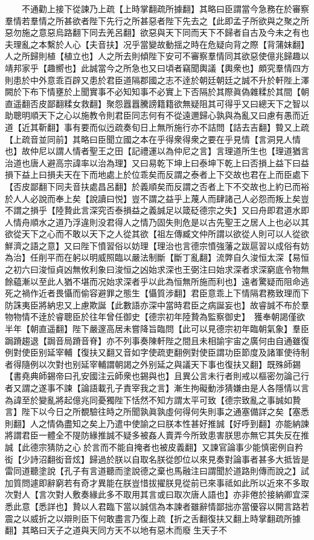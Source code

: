 　　不通勸上接下從諫乃上疏【上時掌翻疏所據翻】其略曰臣謂當今急務在於審察羣情若羣情之所甚欲者陛下先行之所甚惡者陛下先去之【此即孟子所欲與之聚之所惡勿施之意惡烏路翻下同去羌呂翻】欲惡與天下同而天下不歸者自古及今未之有也夫理亂之本繫於人心【夫音扶】况乎當變故動揺之時在危疑向背之際【背蒲妺翻】人之所歸則植【植立也】人之所去則傾陛下安可不審察羣情同其欲惡使億兆歸趣以靖邦家乎【趣嚮也】此誠當今之所急也又曰頃者竊聞輿議【輿衆也】頗究羣情四方則患於中外意乖百辟又患於君臣道隔郡國之志不逹於朝廷朝廷之誠不升於軒陛上澤闕於下布下情壅於上聞實事不必知知事不必實上下否隔於其際眞偽雜糅於其間【朝直遥翻否皮鄙翻糅女救翻】聚怨囂囂騰謗籍籍欲無疑阻其可得乎又曰總天下之智以助聰明順天下之心以施教令則君臣同志何有不從遠邇歸心孰與為亂又曰慮有愚而近道【近其靳翻】事有要而似迃疏奏旬日上無所施行亦不詰問【詰去吉翻】䞇又上疏【上疏音並同前】其略曰臣聞立國之本在乎得衆得衆之要在乎見情【言洞見人情也】故仲尼以謂人情者聖王之田【記禮運以為仲尼之言】言理道所生也【理道猶言治道也唐人避高宗諱率以治為理】又曰易乾下坤上曰泰坤下乾上曰否損上益下曰益損下益上曰損夫天在下而地處上於位乖矣而反謂之泰者上下交故也君在上而臣處下【否皮鄙翻下同夫音扶處昌呂翻】於義順矣而反謂之否者上下不交故也上約已而裕於人人必說而奉上矣【說讀曰悦】豈不謂之益乎上蔑人而肆諸己人必怨而叛上矣豈不謂之損乎【陸贄此言深究否泰損益之義誠足以箴砭德宗之失】又曰舟即君道水即人情舟順水之道乃浮違則没君得人之情乃固失則危是以古先聖王之居人上也必以其欲從天下之心而不敢以天下之人從其欲【祖左傳臧文仲所謂以欲從人則可以人從欲鮮濟之語之意】又曰陛下憤習俗以妨理【理治也言德宗憤強藩之跋扈習以成俗有妨為治】任削平而在躬以明威照臨以嚴法制斷【斷丁亂翻】流弊自久浚恒太深【易恒之初六曰浚恒貞凶無攸利象曰浚恒之凶始求深也王弼注曰始求深者求深窮底令物無餘藴漸以至此人猶不堪而况始求深者乎以此為恒無所施而利也】遠者驚疑而阻命逃死之禍作近者畏懾而偷容避罪之態生【懾質涉翻】君臣意乖上下情隔君務致理而下防誅夷臣將納忠又上慮欺誕【此數語亦深中當時君臣之病誕妄也】故睿誠不布於羣物物情不逹於睿聰臣於往年曾任御史【德宗初年陸贄為監察御史】　獲奉朝謁僅欲半年【朝直遥翻】陛下嚴邃高居未嘗降旨臨問【此可以見德宗初年臨朝氣象】羣臣跼蹐趨退【跼音局蹐音脊】亦不列事奏陳軒陛之間且未相諭宇宙之廣何由自通雖復例對使臣别延宰輔【復扶又翻又音如字使疏吏翻例對使臣謂功臣節度及諸軍使待制者得隨例以次對也别延宰輔謂朝謁之外别延之與議天下事也復扶又翻】既殊師錫【書堯典師錫帝曰孔安國注云師衆也錫與也】且異公言未行者則戒以樞密勿論己行者又謂之遂事不諫【論語載孔子責宰我之言】漸生拘礙動涉猜嫌由是人各隱情以言為諱至於變亂將起億兆同憂獨陛下恬然不知方謂太平可致【德宗致亂之事誠如贄言】陛下以今日之所覩驗往時之所聞孰眞孰虛何得何失則事之通塞備詳之矣【塞悉則翻】人之情偽盡知之矣上乃遣中使諭之曰朕本性甚好推誠【好呼到翻】亦能納諫將謂君臣一體全不隄防緣推誠不疑多被姦人賣弄今所致患害朕思亦無它其失反在推誠【此德宗猜防之心於言而不能自掩者也被皮義翻】又諫官論事少能慎密例自矜衒【少詩沼翻衒音炫】歸過於朕以自取名朕從卽位以來見奏對論事者甚多大抵皆是雷同道聽塗說【孔子有言道聽而塗說德之棄也馬融注曰謂聞於道路則傳而說之】試加質問遽即辭窮若有奇才異能在朕豈惜拔擢朕見從前已來事祗如此所以近來不多取次對人【言次對人敷奏緣此多不取用其言或曰取次唐人語也】亦非倦於接納卿宜深悉此意【悉詳也】贄以人君臨下當以誠信為本諫者雖辭情鄙拙亦當優容以開言路若震之以威折之以辯則臣下何敢盡言乃復上疏【折之舌翻復扶又翻上時掌翻疏所據翻】其略曰天子之道與天同方天不以地有惡木而廢生天子不